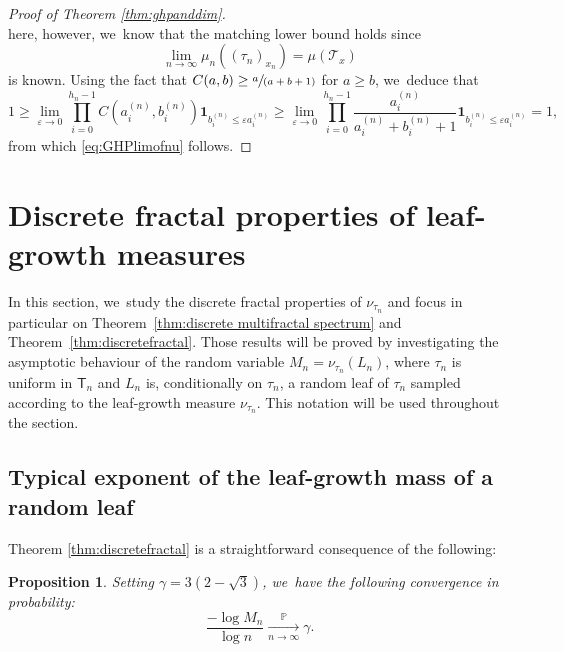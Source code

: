 \documentclass[11pt]{article}
\newcommand{\spfrac}[2]{\sfrac{#1}{(#2)}}
\let\dH\gamma
\newcommand{\pr}{\mathbb{P}}
\newcommand{\sT}{\mathsf{T}}
\newtheorem{prop}[thm]{Proposition}
\theoremstyle{definition}
\begin{document}
\begin{proof}[Proof of Theorem \ref{thm:ghpanddim}]
\[\]
here, however, we~know that the matching lower bound holds since\vspace*{-3pt}
\[
\lim_{n \to \infty} \mu_n((\tau_n)_{x_n}) = \mu(\mathcal{T}_x)
\]
is known. Using the fact that $C(a,b) \geq \spfrac{a}{a+b+1}$ for $a \geq b$, we~deduce that\vspace*{-3pt}
\[
1\geq \lim_{\varepsilon \to 0} \prod_{i=0}^{h_n-1} C(a_i^{(n)}, b_i^{(n)})\mathbf{1}_{b_i^{(n)} \leq \varepsilon a_i^{(n)}} \geq \lim_{\varepsilon \to 0} \prod_{i=0}^{h_n-1} \frac{a_i^{(n)}}{a_i^{(n)}+b_i^{(n)}+1}\mathbf{1}_{b_i^{(n)} \leq \varepsilon a_i^{(n)}} = 1,
\]
from which \eqref{eq:GHPlimofnu} follows.
\end{proof}

\section{Discrete fractal properties of leaf-growth measures}
In this section, we~study the discrete fractal properties of $\nu_{\tau_n}$ and focus in particular on Theorem~\ref{thm:discrete multifractal spectrum} and Theorem~\ref{thm:discretefractal}. Those results will be proved by investigating the asymptotic behaviour of the random variable $M_n=\nu_{\tau_n}(L_n)$, where $\tau_n$ is uniform in $\sT_n$ and $L_n$ is, conditionally on $\tau_n$, a random leaf of $\tau_n$ sampled according to the leaf-growth measure $\nu_{\tau_n}$. This notation will be used throughout the section.

\subsection{Typical exponent of the leaf-growth mass of a random leaf}\label{section:discrete Hausdorff}
Theorem \ref{thm:discretefractal} is a straightforward consequence of the following:
\begin{prop}
Setting $\dH=3(2-\sqrt{3})$, we~have the following convergence in probability:\vspace*{-3pt}
\[
\frac{-\log M_n}{\log n} \xrightarrow[\textstyle n\to\infty]{\textstyle\pr}\dH.
\]
\end{prop}
\end{document}
